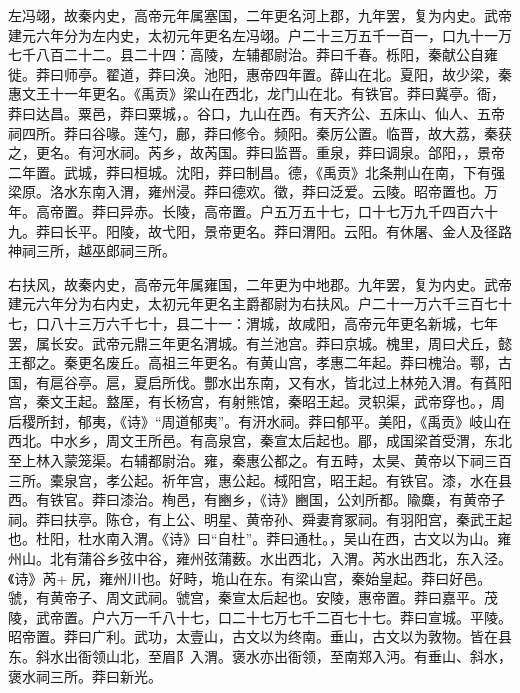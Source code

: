 \documentclass[12pt,UTF8]{ctexbook}
\begin{document}
左冯翊，故秦内史，高帝元年属塞国，二年更名河上郡，九年罢，复为内史。武帝建元六年分为左内史，太初元年更名左冯翊。户二十三万五千一百一，口九十一万七千八百二十二。县二十四：高陵，左辅都尉治。莽曰千春。栎阳，秦献公自雍徙。莽曰师亭。翟道，莽曰涣。池阳，惠帝四年置。薛山在北。夏阳，故少梁，秦惠文王十一年更名。《禹贡》梁山在西北，龙门山在北。有铁官。莽曰冀亭。衙，莽曰达昌。粟邑，莽曰粟城，。谷口，九山在西。有天齐公、五床山、仙人、五帝祠四所。莽曰谷喙。莲勺，鄜，莽曰修令。频阳。秦厉公置。临晋，故大荔，秦获之，更名。有河水祠。芮乡，故芮国。莽曰监晋。重泉，莽曰调泉。郃阳，，景帝二年置。武城，莽曰桓城。沈阳，莽曰制昌。德，《禹贡》北条荆山在南，下有强梁原。洛水东南入渭，雍州浸。莽曰德欢。徵，莽曰泛爱。云陵。昭帝置也。万年。高帝置。莽曰异赤。长陵，高帝置。户五万五十七，口十七万九千四百六十九。莽曰长平。阳陵，故弋阳，景帝更名。莽曰渭阳。云阳。有休屠、金人及径路神祠三所，越巫郎祠三所。



右扶风，故秦内史，高帝元年属雍国，二年更为中地郡。九年罢，复为内史。武帝建元六年分为右内史，太初元年更名主爵都尉为右扶风。户二十一万六千三百七十七，口八十三万六千七十，县二十一：渭城，故咸阳，高帝元年更名新城，七年罢，属长安。武帝元鼎三年更名渭城。有兰池宫。莽曰京城。槐里，周曰犬丘，懿王都之。秦更名废丘。高祖三年更名。有黄山宫，孝惠二年起。莽曰槐治。鄠，古国，有扈谷亭。扈，夏启所伐。酆水出东南，又有水，皆北过上林苑入渭。有萯阳宫，秦文王起。盩厔，有长杨宫，有射熊馆，秦昭王起。灵轵渠，武帝穿也。，周后稷所封，郁夷，《诗》“周道郁夷”。有汧水祠。莽曰郁平。美阳，《禹贡》岐山在西北。中水乡，周文王所邑。有高泉宫，秦宣太后起也。郿，成国梁首受渭，东北至上林入蒙笼渠。右辅都尉治。雍，秦惠公都之。有五畤，太昊、黄帝以下祠三百三所。橐泉宫，孝公起。祈年宫，惠公起。棫阳宫，昭王起。有铁官。漆，水在县西。有铁官。莽曰漆治。栒邑，有豳乡，《诗》豳国，公刘所都。隃麋，有黄帝子祠。莽曰扶亭。陈仓，有上公、明星、黄帝孙、舜妻育冢祠。有羽阳宫，秦武王起也。杜阳，杜水南入渭。《诗》曰“自杜”。莽曰通杜。，吴山在西，古文以为山。雍州山。北有蒲谷乡弦中谷，雍州弦蒲薮。水出西北，入渭。芮水出西北，东入泾。《诗》芮+尻，雍州川也。好畤，垝山在东。有梁山宫，秦始皇起。莽曰好邑。虢，有黄帝子、周文武祠。虢宫，秦宣太后起也。安陵，惠帝置。莽曰嘉平。茂陵，武帝置。户六万一千八十七，口二十七万七千二百七十七。莽曰宣城。平陵。昭帝置。莽曰广利。武功，太壹山，古文以为终南。垂山，古文以为敦物。皆在县东。斜水出衙领山北，至眉阝入渭。褒水亦出衙领，至南郑入沔。有垂山、斜水，褒水祠三所。莽曰新光。
\end{document}
